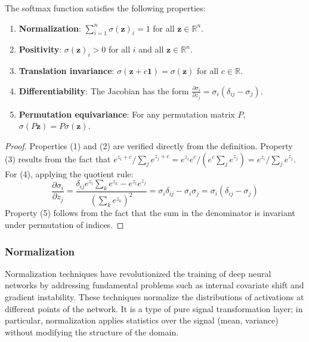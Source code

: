 \begin{proposition}\label{prop:softmax_propiedades}
The softmax function satisfies the following properties:
\begin{enumerate}
	\item \textbf{Normalization}: $\sum_{i=1}^n \sigma(\mathbf{z})_i = 1$ for all $\mathbf{z} \in \mathbb{R}^n$.
	\item \textbf{Positivity}: $\sigma(\mathbf{z})_i > 0$ for all $i$ and all $\mathbf{z} \in \mathbb{R}^n$.
	\item \textbf{Translation invariance}: $\sigma(\mathbf{z} + c\mathbf{1}) = \sigma(\mathbf{z})$ for all $c \in \mathbb{R}$.
	\item \textbf{Differentiability}: The Jacobian has the form $\frac{\partial \sigma_i}{\partial z_j} = \sigma_i(\delta_{ij} - \sigma_j)$.
	\item \textbf{Permutation equivariance}: For any permutation matrix $P$, $\sigma(P\mathbf{z}) = P\sigma(\mathbf{z})$.
\end{enumerate}
\end{proposition}

\begin{proof}
Properties (1) and (2) are verified directly from the definition. Property (3) results from the fact that $e^{z_i + c}/\sum_j e^{z_j + c} = e^{z_i}e^c/(e^c\sum_j e^{z_j}) = e^{z_i}/\sum_j e^{z_j}$. For (4), applying the quotient rule:
\[
\frac{\partial \sigma_i}{\partial z_j} = \frac{\delta_{ij}e^{z_i}\sum_k e^{z_k} - e^{z_i}e^{z_j}}{(\sum_k e^{z_k})^2} = \sigma_i\delta_{ij} - \sigma_i\sigma_j = \sigma_i(\delta_{ij} - \sigma_j)
\]
Property (5) follows from the fact that the sum in the denominator is invariant under permutation of indices.
\end{proof}

\subsubsection{Normalization}

Normalization techniques have revolutionized the training of deep neural networks by addressing fundamental problems such as internal covariate shift and gradient instability. These techniques normalize the distributions of activations at different points of the network. It is a type of pure signal transformation layer; in particular, normalization applies statistics over the signal (mean, variance) without modifying the structure of the domain.

